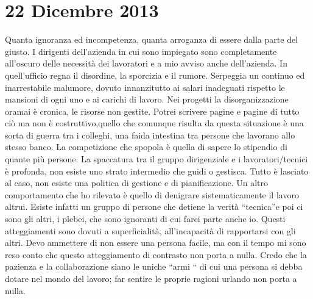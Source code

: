 \section{22 Dicembre 2013}

Quanta ignoranza ed incompetenza, quanta arroganza di essere dalla parte del giusto. I dirigenti dell’azienda in cui sono impiegato sono completamente all’oscuro delle necessità dei lavoratori e a mio avviso anche dell’azienda.
In quell’ufficio regna il disordine, la sporcizia e il rumore. Serpeggia un continuo ed inarrestabile malumore, dovuto innanzitutto ai salari inadeguati rispetto le mansioni di ogni uno e ai carichi di lavoro.
Nei progetti la disorganizzazione oramai è cronica, le risorse non gestite. Potrei scrivere pagine e pagine di tutto ciò ma non è costruttivo,quello che comunque risulta da questa situazione è una sorta di guerra tra i colleghi, una faida intestina tra persone che lavorano allo stesso banco.
La competizione che spopola è quella di sapere lo stipendio di quante più persone. La spaccatura tra il gruppo dirigenziale e i lavoratori/tecnici è profonda, non esiste uno strato intermedio che guidi o gestisca. Tutto è lasciato al caso, non esiste una politica di gestione e di pianificazione.
Un altro comportamento che ho rilevato è quello di denigrare sistematicamente il lavoro altrui. Esiste infatti un gruppo di persone che detiene la verità “tecnica”e poi ci sono gli altri, i plebei, che sono ignoranti di cui farei parte anche io.
Questi atteggiamenti sono dovuti a superficialità, all’incapacità di rapportarsi con gli altri. Devo ammettere di non essere una persona facile, ma con il tempo mi sono reso conto che questo atteggiamento di contrasto non porta a nulla. Credo che la pazienza e la collaborazione siano le uniche “armi “ di cui una persona si debba dotare nel mondo del lavoro; far sentire le proprie ragioni urlando non porta a nulla.

